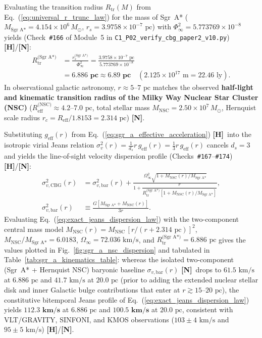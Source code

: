 \documentclass[11pt,a4paper]{article}
\newcommand{\catH}{\textbf{\textcolor{orange!85!black}{[H]}}}
\newcommand{\catN}{\textbf{\textcolor{teal!75!black}{[N]}}}
\theoremstyle{plain}
\theoremstyle{definition}
\theoremstyle{remark}
\numberwithin{equation}{section}
\begin{document}
Evaluating the transition radius $R_{\text{tr}}(M)$ from Eq.~(\ref{eq:universal_r_trunc_law}) for the mass of Sgr~A* ($M_{\text{Sgr A*}} = 4.154 \times 10^6\,M_\odot$, $r_s = 3.9758 \times 10^{-7}\text{ pc}$) with $\Phi_{\infty}^2 = 5.773769 \times 10^{-8}$ yields (Check~\texttt{\#166} of Module~5 in \allowbreak\texttt{C1\_P02\_verify\_cbg\_paper2\_v10.py}) \catH/\catN:
\begin{align}
R_{\text{tr}}^{\text{(Sgr A*)}} &= \frac{r_s^{\text{(Sgr A*)}}}{\Phi_{\infty}^2} = \frac{3.9758 \times 10^{-7}\text{ pc}}{5.773769 \times 10^{-8}} \nonumber \\[3pt]
&= \mathbf{6.886\text{ pc}} \approx \mathbf{6.89\text{ pc}} \quad \left(2.125 \times 10^{17}\text{ m} = 22.46\text{ ly}\right).
\label{eq:sgr_a_690_pc_prediction}
\end{align}
In observational galactic astronomy, $r \approx 5\text{--}7\text{ pc}$ matches the observed \textbf{half-light and kinematic transition radius of the Milky Way Nuclear Star Cluster (NSC)} ($R_{\text{eff}}^{\text{(NSC)}} \approx 4.2\text{--}7.0\text{ pc}$, total stellar mass $M_{\text{NSC}} = 2.50 \times 10^7\,M_\odot$, Hernquist scale radius $r_c = R_{\text{eff}}/1.8153 = 2.314\text{ pc}$) \cite{schodel2014,feldmeier2017} \catN.

Substituting $g_{\text{eff}}(r)$ from Eq.~(\ref{eq:sgr_a_effective_acceleration}) \catH\ into the isotropic virial Jeans relation $\sigma_v^2(r) = \frac{1}{d_s}r\,g_{\text{eff}}(r) = \frac{1}{3}r\,g_{\text{eff}}(r)$ cancels $d_s = 3$ and yields the line-of-sight velocity dispersion profile (Checks~\texttt{\#167}--\texttt{\#174}) \catH/\catN:
\begin{align}
\sigma_{v,\text{CBG}}^2(r) &= \sigma_{v,\text{bar}}^2(r) + \frac{\Omega_{\infty}^2 \sqrt{1 + M_{\text{NSC}}(r)/M_{\text{Sgr A*}}}}{1 + \dfrac{r}{R_{\text{tr}}^{\text{(Sgr A*)}}\left[1 + M_{\text{NSC}}(r)/M_{\text{Sgr A*}}\right]}}, \nonumber \\[4pt]
\sigma_{v,\text{bar}}^2(r) &\equiv \frac{G\left[M_{\text{Sgr A*}} + M_{\text{NSC}}(r)\right]}{3 r}.
\label{eq:exact_jeans_dispersion_law}
\end{align}
Evaluating Eq.~(\ref{eq:exact_jeans_dispersion_law}) with the two-component central mass model $M_{\text{NSC}}(r) = M_{\text{NSC}}\,[r / (r + 2.314\text{ pc})]^2$, $M_{\text{NSC}} / M_{\text{Sgr A*}} = 6.0183$, $\Omega_{\infty} = 72.036\text{ km/s}$, and $R_{\text{tr}}^{\text{(Sgr A*)}} = 6.886\text{ pc}$ gives the values plotted in Fig.~\ref{fig:sgr_a_nsc_dispersion} and tabulated in Table~\ref{tab:sgr_a_kinematics_table}: whereas the isolated two-component (Sgr~A* + Hernquist NSC) baryonic baseline $\sigma_{v,\text{bar}}(r)$ \catN\ drops to $61.5\text{ km/s}$ at $6.886\text{ pc}$ and $41.7\text{ km/s}$ at $20.0\text{ pc}$ (prior to adding the extended nuclear stellar disk and inner Galactic bulge contributions that enter at $r \gtrsim 15\text{--}20\text{ pc}$), the constitutive bitemporal Jeans profile of Eq.~(\ref{eq:exact_jeans_dispersion_law}) yields $\mathbf{112.3\text{ km/s}}$ at $6.886\text{ pc}$ and $\mathbf{100.5\text{ km/s}}$ at $20.0\text{ pc}$, consistent with VLT/GRAVITY, SINFONI, and KMOS observations ($103 \pm 4\text{ km/s}$ and $95 \pm 5\text{ km/s}$) \cite{schodel2014,feldmeier2017} \catH/\catN.
\end{document}
